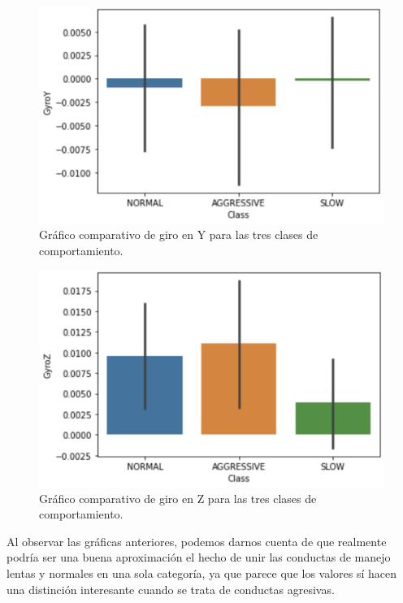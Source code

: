 \documentclass[runningheads]{llncs}
\begin{document}
    \begin{figure}
        \centering
        \includegraphics[width=1\columnwidth]{GyroY.png}
        \caption{Gráfico comparativo de giro en Y para las tres clases de comportamiento.}
        \label{fig:comand}%
    \end{figure}

    \begin{figure}
        \centering
        \includegraphics[width=1\columnwidth]{GyroZ.png}
        \caption{Gráfico comparativo de giro en Z para las tres clases de comportamiento.}
        \label{fig:comand}%
    \end{figure}

\newpage

\textsc Al observar las gráficas anteriores, podemos darnos cuenta de que realmente podría ser una buena aproximación el hecho de unir las conductas de manejo lentas y normales en una sola categoría, ya que parece que los valores sí hacen una distinción interesante cuando se trata de conductas agresivas. \\
\end{document}
